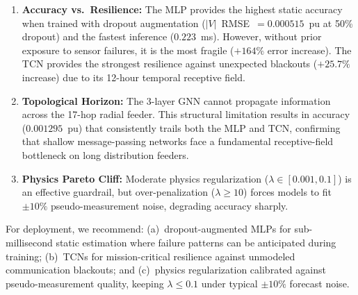 \documentclass[conference]{IEEEtran}
\begin{document}
\begin{enumerate}
    \item \textbf{Accuracy vs.\ Resilience:} The MLP provides the highest static accuracy when trained with dropout augmentation ($|V|$~RMSE~$= 0.000515$~pu at 50\% dropout) and the fastest inference ($0.223$~ms). However, without prior exposure to sensor failures, it is the most fragile ($+164\%$ error increase). The TCN provides the strongest resilience against unexpected blackouts ($+25.7\%$ increase) due to its 12-hour temporal receptive field.

    \item \textbf{Topological Horizon:} The 3-layer GNN cannot propagate information across the 17-hop radial feeder. This structural limitation results in accuracy ($0.001295$~pu) that consistently trails both the MLP and TCN, confirming that shallow message-passing networks face a fundamental receptive-field bottleneck on long distribution feeders.

    \item \textbf{Physics Pareto Cliff:} Moderate physics regularization ($\lambda \in [0.001, 0.1]$) is an effective guardrail, but over-penalization ($\lambda \ge 10$) forces models to fit ${\pm}10\%$ pseudo-measurement noise, degrading accuracy sharply.
\end{enumerate}

For deployment, we recommend: (a)~dropout-augmented MLPs for sub-millisecond static estimation where failure patterns can be anticipated during training; (b)~TCNs for mission-critical resilience against unmodeled communication blackouts; and (c)~physics regularization calibrated against pseudo-measurement quality, keeping $\lambda \le 0.1$ under typical ${\pm}10\%$ forecast noise.
\end{document}
